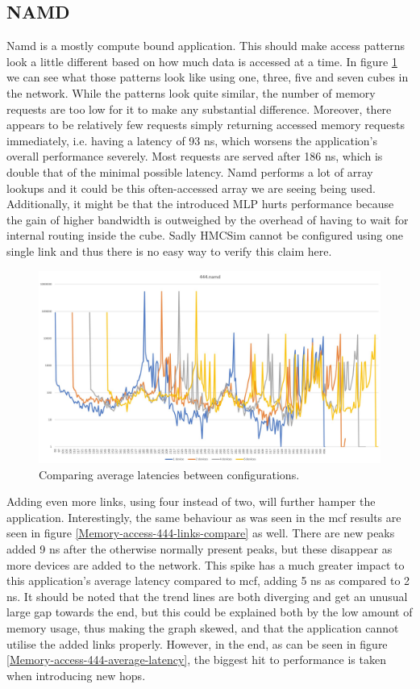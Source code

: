 \subsection{NAMD}
Namd is a mostly compute bound application. This should make access patterns look a little different based on how much data is accessed at a time. In figure \ref{Memory-access-444} we can see what those patterns look like using one, three, five and seven cubes in the network. While the patterns look quite similar, the number of memory requests are too low for it to make any substantial difference. Moreover, there appears to be relatively few requests simply returning accessed memory requests immediately, i.e. having a latency of 93 ns, which worsens the application's overall performance severely. Most requests are served after 186 ns, which is double that of the minimal possible latency. Namd performs a lot of array lookups and it could be this often-accessed array we are seeing being used. Additionally, it might be that the introduced MLP hurts performance because the gain of higher bandwidth is outweighed by the overhead of having to wait for internal routing inside the cube. Sadly HMCSim cannot be configured using one single link and thus there is no easy way to verify this claim here.
\bigskip

\begin{figure}[!ht]
    \centering
    \includegraphics[width=1\linewidth]{figure/444-x_4-1.jpg}
    \caption{Comparing average latencies between configurations.}
    \label{Memory-access-444}
\end{figure}

Adding even more links, using four instead of two, will further hamper the application. Interestingly, the same behaviour as was seen in the mcf results are seen in figure \ref{Memory-access-444-links-compare} as well. There are new peaks added 9 ns after the otherwise normally present peaks, but these disappear as more devices are added to the network. This spike has a much greater impact to this application's average latency compared to mcf, adding 5 ns as compared to 2 ns. It should be noted that the trend lines are both diverging and get an unusual large gap towards the end, but this could be explained both by the low amount of memory usage, thus making the graph skewed, and that the application cannot utilise the added links properly. However, in the end, as can be seen in figure \ref{Memory-access-444-average-latency}, the biggest hit to performance is taken when introducing new hops. 

